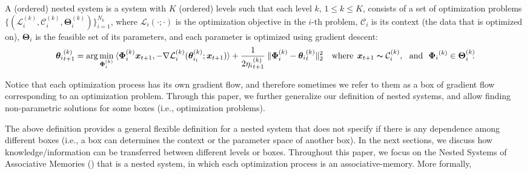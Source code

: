 \begin{dfn}
    A (ordered) nested system is a system with $K$ (ordered) levels such that each level $k$, $1 \leq k \leq K$, consists of a set of optimization problems $\{ (\mathcal{L}^{(k)}_{i},  \mathcal{C}^{(k)}_i, \boldsymbol{\Theta}^{(k)}_{i}) \}_{i = 1}^{N_k}$, where $\mathcal{L}_{i}(\cdot; \cdot)$ is the optimization objective in the $i$-th problem, $\mathcal{C}_i$ is its context (the data that is optimized on), $\boldsymbol{\Theta}_{i}$ is the feasible set of its parameters, and each parameter is optimized using gradient descent:
    \begin{align}
        {\boldsymbol{\theta}_{i}}^{(k)}_{t+1} = \arg\min_{\boldsymbol{\Phi}^{(k)}_{i}} \: \langle \boldsymbol{\Phi}^{(k)}_{i} \boldsymbol{x}_{t+1}, - \nabla \mathcal{L}^{(k)}_i(\boldsymbol{\theta}^{(k)}_{i_t};\boldsymbol{x}_{t+1}) \rangle + \frac{1}{2{\eta_{i}}^{(k)}_{t+1}}\:\|\boldsymbol{\Phi}^{(k)}_{i} - {\boldsymbol{\theta}_{i}}^{(k)}_{t} \|^{2}_2 \quad \text{where}\:\:\boldsymbol{x}_{t+1} \thicksim \mathcal{C}^{(k)}_i, \:\:\: \text{and} \:\:\: {\boldsymbol{\Phi}_{i}}^{(k)} \in  \boldsymbol{\Theta}^{(k)}_{i}\!\!.
    \end{align}
\end{dfn} 

Notice that each  optimization process has its own gradient flow, and therefore sometimes  we refer to them as a box of gradient flow corresponding to an optimization problem. Through this paper, we further generalize our definition of nested systems, and allow finding non-parametric solutions for some boxes (i.e., optimization problems).   


The above definition provides a general flexible definition for a nested system that does not specify if there is any dependence among different boxes  (i.e., a box can determines the context or the parameter space of another box). In the next sections, we discuss how  knowledge/information can be transferred between different levels or boxes. Throughout this paper, we focus on the Nested Systems of Associative Memories (\nsam) that is a nested system, in which each optimization process is an associative-memory. More formally,

